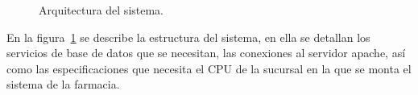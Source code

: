 \begin{figure}[htbp!]
	\begin{center}
		\caption{Arquitectura del sistema.}
		\label{fig:arquitectura}
	\end{center}
\end{figure}

En la figura~\ref{fig:arquitectura} se describe la estructura del sistema, en ella se detallan los servicios de base de datos que se necesitan, las conexiones al servidor apache, así como las especificaciones que necesita el CPU de la sucursal en la que se monta el sistema de la farmacia.



